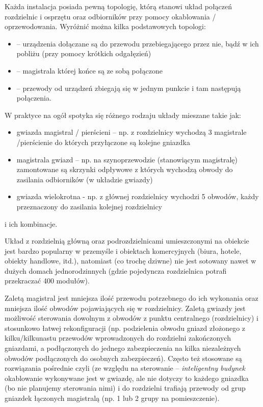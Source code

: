 Każda instalacja posiada pewną topologię, którą stanowi układ połączeń rozdzielnic i osprzętu oraz odbiorników przy pomocy okablowania / oprzewodowania.
Wyróżnić można kilka podstawowych topologi:
\begin{itemize}
	\item {} – urządzenia dołączane są do przewodu przebiegającego przez nie, bądź w ich pobliżu (przy pomocy krótkich odgałęzień)
		\item {} – magistrala której końce są ze sobą połączone
	\item {} – przewody od urządzeń zbiegają się w jednym punkcie i tam następują połączenia.
\end{itemize}
W praktyce na ogół spotyka się różnego rodzaju układy mieszane takie jak:
\begin{itemize}
	\item gwiazda magistral / pierścieni – np. z rozdzielnicy wychodzą 3 magistrale /pierścienie do których przyłączone są kolejne gniazdka
	\item magistrala gwiazd – np. na szynoprzewodzie (stanowiącym magistralę) zamontowane są skrzynki odpływowe z których wychodzą obwody do zasilania odbiorników (w układzie gwiazdy)
	\item gwiazda wielokrotna - np. z głównej rozdzielnicy wychodzi 5 obwodów, każdy przeznaczony do zasilania kolejnej rozdzielnicy
\end{itemize}\nopagebreak[4]%
i ich kombinacje.\pagebreak[1]

Układ z rozdzielnią główną oraz podrozdzielnicami umieszczonymi na obiekcie jest bardzo popularny w przemyśle i obiektach komercyjnych (biura, hotele, obiekty handlowe, itd.), natomiast (co trochę dziwne) nie jest sotowany nawet w dużych domach jednorodzinnych (gdzie pojedyncza rozdzielnica potrafi przekraczać 400 modułów).

Zaletą magistral jest mniejsza ilość przewodu potrzebnego do ich wykonania oraz mniejsza ilość obwodów pojawiających się w rozdzielnicy.
Zaletą gwiazdy jest możliwość sterowania dowolnym z obwodów z punktu centralnego (rozdzielnicy) i stosunkowo łatwej rekonfiguracji
	(np. podzielenia obwodu gniazd złożonego z kilku/kilkunastu przewodów wprowadzonych do rozdzielni zakończonych gniazdami, a podłączonych do jednego zabezpieczenia na kilka niezależnych obwodów podłączonych do osobnych zabezpieczeń).
Często też stosowane są rozwiązania pośrednie czyli (ze względu na sterowanie – \textit{inteligentny budynek} okablowanie wykonywane jest w gwiazdę,
	ale nie dotyczy to każdego gniazdka (bo nie planujemy sterowania nimi) i do rozdzielni trafiają przewody od grup gniazdek łączonych magistralą (np. 1 lub 2 grupy na pomieszczenie).

